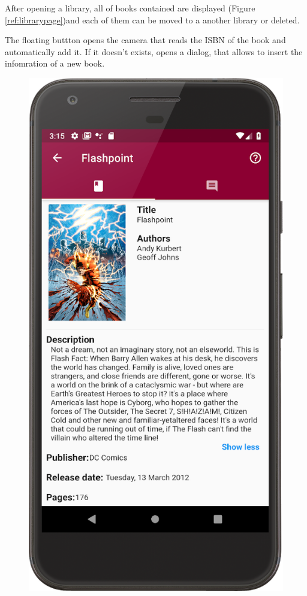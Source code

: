 After opening a library, all of books contained are displayed (Figure \ref{ref:librarypage})and each of them can be moved to a another library or deleted.

The floating buttton opens the camera that reads the ISBN of the book and automatically add it. 
If it doesn’t exists, opens a dialog, that allows to insert the infomration of a new book.
\clearpage
\begin{figure}[!htb]
    \begin{minipage}[b]{0.3\textwidth}
        \centering
        \includegraphics[scale=1]{images/book-info-page.png}

\end{minipage}
\end{figure}
